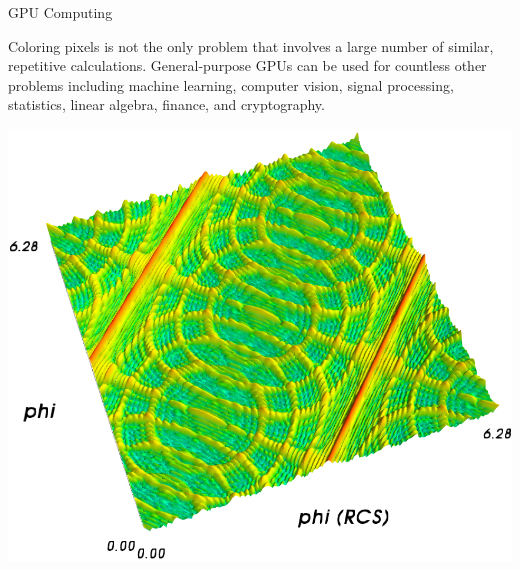 \documentclass{lug}
\newcommand{\pmidg}[1]{\parbox{\widthof{#1}}{#1}}
\newcommand{\splitslide}[4]{
    \noindent
    \begin{minipage}{#1 \textwidth - #2 }
        #3
    \end{minipage}%
    \hspace{ \dimexpr #2 * 2 \relax }%
    \begin{minipage}{\textwidth - #1 \textwidth - #2 }
        #4
    \end{minipage}
}
\begin{document}
\begin{frame}{GPU Computing}
    \splitslide{0.75}{.7em}{

        Coloring pixels is not the only problem that involves a large number
        of similar, repetitive calculations. General-purpose GPUs can be used
        for countless other problems including machine learning, computer
        vision, signal processing, statistics, linear algebra, finance, and
        cryptography.

    }{
        \pmidg{\includegraphics[width=\textwidth]{graphics/resimg}}
    }
\end{frame}
\end{document}
